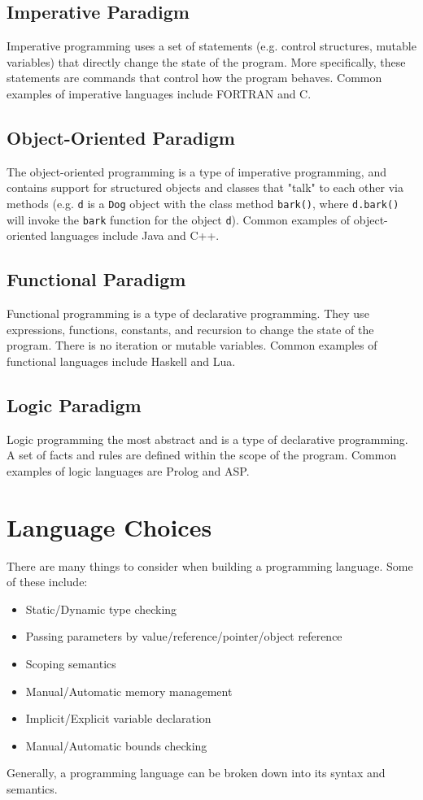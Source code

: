 \documentclass[13pt]{article}
\begin{document}
\subsection{Imperative Paradigm}
Imperative programming uses a set of statements (e.g. control structures, mutable variables) that 
directly change the state of the program. More specifically, these statements are commands that control 
how the program behaves. Common examples of imperative languages include FORTRAN and C.

\subsection{Object-Oriented Paradigm}
The object-oriented programming is a type of imperative programming, and contains support for
structured objects and classes that "talk" to each other via methods (e.g. \texttt{d} is a \texttt{Dog} 
object with the class method \texttt{bark()}, where \texttt{d.bark()} will invoke the \texttt{bark}
function for the object \texttt{d}). Common examples of object-oriented languages include Java and C++.

\subsection{Functional Paradigm}
Functional programming is a type of declarative programming. They use expressions, functions, 
constants, and recursion to change the state of the program. There is no iteration or mutable 
variables. Common examples of functional languages include Haskell and Lua.

\subsection{Logic Paradigm}
Logic programming the most abstract and is a type of declarative programming. A set of facts and
rules are defined within the scope of the program. Common examples of logic languages are Prolog and
ASP.

\section{Language Choices}
There are many things to consider when building a programming language. Some of these include:
\begin{itemize}[label=,leftmargin=*]
\item Static/Dynamic type checking
\item Passing parameters by value/reference/pointer/object reference
\item Scoping semantics
\item Manual/Automatic memory management
\item Implicit/Explicit variable declaration
\item Manual/Automatic bounds checking
\end{itemize}
Generally, a programming language can be broken down into its syntax and semantics.
\end{document}
